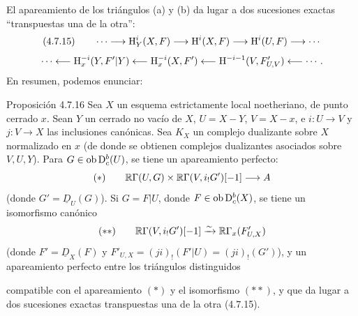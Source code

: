 El apareamiento de los triángulos (a) y (b) da lugar a dos sucesiones exactas \textquotedblleft transpuestas una de la otra\textquotedblright{}:
\[
(4.7.15)\qquad \cdots\longrightarrow \mathrm{H}_Y^i(X,F)\longrightarrow\mathrm{H}^i(X,F)\longrightarrow\mathrm{H}^i(U,F)\longrightarrow\cdots
\]
\[
\cdots\longleftarrow \mathrm{H}_x^{-i}(Y,F'|Y)\longleftarrow\mathrm{H}_x^{-i}(X,F')\longleftarrow\mathrm{H}^{-i-1}(V,F'_{U,V})\longleftarrow\cdots.
\]
En resumen, podemos enunciar:

\begin{statement}{Proposición 4.7.16}
Sea $X$ un esquema estrictamente local noetheriano, de punto cerrado $x$. Sean $Y$ un cerrado no vacío de $X$, $U=X-Y$, $V=X-x$, e $i:U\to V$ y $j:V\to X$ las inclusiones canónicas. Sea $K_X$ un complejo dualizante sobre $X$ normalizado en $x$ (de donde se obtienen complejos dualizantes asociados sobre $V,U,Y$). Para $G\in\operatorname{ob}\mathrm{D}_c^b(U)$, se tiene un apareamiento perfecto:
\[
(*)\qquad \mathbb{R}\Gamma(U,G)\times\mathbb{R}\Gamma(V,i_!G')[-1]\longrightarrow A
\]
(donde $G'=\underline{D}_U(G)$). Si $G=F|U$, donde $F\in\operatorname{ob}\mathrm{D}_c^b(X)$, se tiene un isomorfismo canónico
\[
(**)\qquad \mathbb{R}\Gamma(V,i_!G')[-1]\xrightarrow{\sim}\mathbb{R}\Gamma_x(F'_{U,X})
\]
(donde $F'=\underline{D}_X(F)$ y $F'_{U,X}=(ji)_!(F'|U)=(ji)_!(G')$), y un apareamiento perfecto entre los triángulos distinguidos
\begin{center}
\end{center}
compatible con el apareamiento $(*)$ y el isomorfismo $(**)$, y que da lugar a dos sucesiones exactas transpuestas una de la otra (4.7.15).
\end{statement}

